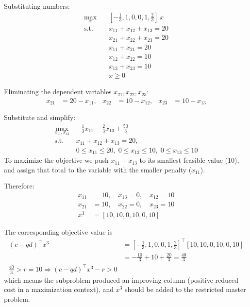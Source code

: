 \documentclass[11pt]{exam}
\begin{document}
\begin{questions}
\begin{parts}
        Substituting numbers:
        \begin{align*}
        \max_x \quad & [-\tfrac{1}{3}, 1, 0, 0, 1, \tfrac{2}{3}]\,x\\
        \text{s.t.}\quad &
          x_{11} + x_{12} + x_{13} = 20\\
          & x_{21} + x_{22} + x_{23} = 20\\
          & x_{11} + x_{21} = 20\\
          & x_{12} + x_{22} = 10\\
          & x_{13} + x_{23} = 10\\
          & x \ge 0
        \end{align*}
        
        Eliminating the dependent variables $x_{21},x_{22},x_{23}$:
        \begin{align*}
        x_{21} &= 20 - x_{11}, &
        x_{22} &= 10 - x_{12}, &
        x_{23} &= 10 - x_{13}
        \end{align*}
        
        Substitute and simplify:
        \begin{align*}
          \max_{x_{11},x_{13}}\, & -\tfrac{1}{3}x_{11} - \tfrac{2}{3}x_{13} + \tfrac{50}{3}\\
          \text{s.t.}\;
          & x_{11} + x_{12} + x_{13} = 20,\\
          & 0 \le x_{11} \le 20,\;
          0 \le x_{12} \le 10,\;
          0 \le x_{13} \le 10
        \end{align*}
        To maximize the objective we push $x_{11}+x_{13}$ to its smallest feasible value (10), and  assign that total to the variable with the smaller penalty ($x_{11}$).
        
        Therefore:
        \begin{align*}
        x_{11}&=10,\quad x_{13}=0,\quad x_{12}=10\\
        x_{21}&=10,\quad x_{22}=0,\quad x_{23}=10\tag{backsubstitute}\\
        x^3 &= [10, 10, 0, 10, 0, 10]
        \end{align*}
        
        The corresponding objective value is
        \begin{align*}
        (c - q d)^\top x^3 &= [-\tfrac{1}{3},1,0,0,1,\tfrac{2}{3}]^\top[10,10,0,10,0,10]\\
        &= -\tfrac{10}{3} + 10 + \tfrac{20}{3} = \tfrac{40}{3}\\
        \tfrac{40}{3} > r = 10 \Longrightarrow (c - q d)^\top x^3 - r > 0
        \end{align*}
        which means the subproblem produced an improving column (positive reduced cost in a maximization context), and $x^3$ should be added to the restricted master problem.  


\end{parts}
\end{questions}
\end{document}
